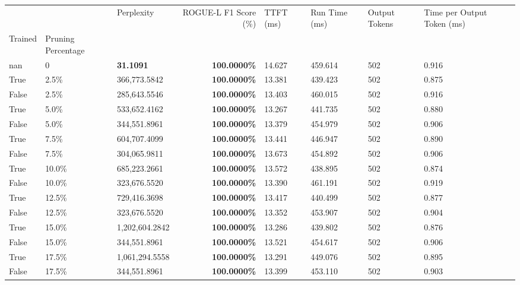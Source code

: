 \begin{table}[H]
\label{tab:evaluation-pipeline-11}
\begin{tabular}{lllrllll}
\toprule
 &  & Perplexity & ROGUE-L F1 Score (\%) & TTFT (ms) & Run Time (ms) & Output Tokens & Time per Output Token (ms) \\
Trained & Pruning Percentage &  &  &  &  &  &  \\
\midrule
nan & 0 & \bfseries 31.1091 & \bfseries 100.0000\% & 14.627 & 459.614 & 502 & 0.916 \\
\cline{1-8}
True & 2.5\% & 366,773.5842 & \bfseries \color{red} 100.0000\% & 13.381 & 439.423 & 502 & 0.875 \\
\cline{1-8}
False & 2.5\% & \color{red} 285,643.5546 & \bfseries \color{red} 100.0000\% & 13.403 & 460.015 & 502 & 0.916 \\
\cline{1-8}
True & 5.0\% & 533,652.4162 & \bfseries \color{red} 100.0000\% & 13.267 & 441.735 & 502 & 0.880 \\
\cline{1-8}
False & 5.0\% & 344,551.8961 & \bfseries \color{red} 100.0000\% & 13.379 & 454.979 & 502 & 0.906 \\
\cline{1-8}
True & 7.5\% & 604,707.4099 & \bfseries \color{red} 100.0000\% & 13.441 & 446.947 & 502 & 0.890 \\
\cline{1-8}
False & 7.5\% & 304,065.9811 & \bfseries \color{red} 100.0000\% & 13.673 & 454.892 & 502 & 0.906 \\
\cline{1-8}
True & 10.0\% & 685,223.2661 & \bfseries \color{red} 100.0000\% & 13.572 & 438.895 & 502 & 0.874 \\
\cline{1-8}
False & 10.0\% & 323,676.5520 & \bfseries \color{red} 100.0000\% & 13.390 & 461.191 & 502 & 0.919 \\
\cline{1-8}
True & 12.5\% & 729,416.3698 & \bfseries \color{red} 100.0000\% & 13.417 & 440.499 & 502 & 0.877 \\
\cline{1-8}
False & 12.5\% & 323,676.5520 & \bfseries \color{red} 100.0000\% & 13.352 & 453.907 & 502 & 0.904 \\
\cline{1-8}
True & 15.0\% & 1,202,604.2842 & \bfseries \color{red} 100.0000\% & 13.286 & 439.802 & 502 & 0.876 \\
\cline{1-8}
False & 15.0\% & 344,551.8961 & \bfseries \color{red} 100.0000\% & 13.521 & 454.617 & 502 & 0.906 \\
\cline{1-8}
True & 17.5\% & 1,061,294.5558 & \bfseries \color{red} 100.0000\% & 13.291 & 449.076 & 502 & 0.895 \\
\cline{1-8}
False & 17.5\% & 344,551.8961 & \bfseries \color{red} 100.0000\% & 13.399 & 453.110 & 502 & 0.903 \\

\end{tabular}
\end{table}
